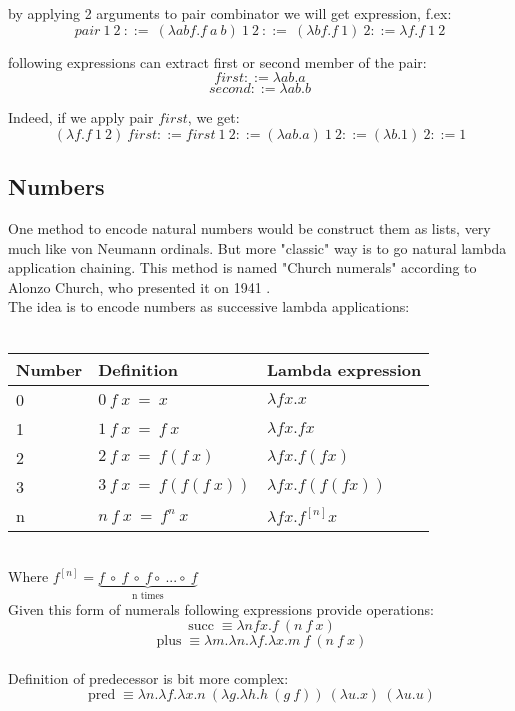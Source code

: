 by applying 2 arguments to pair combinator we will get expression, f.ex:
\[pair\ 1 \ 2\ ::=\ (\lambda{abf}.f\ a\ b)\ 1 \ 2\ ::=\ (\lambda{bf}.f\ 1)\ 2 ::= \lambda{f}.f\ 1\ 2 \]

following expressions can extract first or second member of the pair:
\[first ::= \lambda{ab}.a \] 
\[second ::= \lambda{ab}.b \] 

Indeed, if we apply pair $first$, we get:
\[(\lambda{f}.f\ 1\ 2)\ first ::= first\ 1\ 2 ::= (\lambda{ab}.a)\ 1\ 2 ::= (\lambda{b}.1)\ 2 ::= 1 \]



\subsection{Numbers}

One method to encode natural numbers would be construct them as lists, very much like von Neumann ordinals. But more "classic" way is to go natural lambda
application chaining. This method is named "Church numerals" according to Alonzo Church, who presented it on 1941 .
\\
The idea is to encode numbers as successive lambda applications:
\\
\\
\begin{tabular}{l l l}
    Number & Definition & Lambda expression \\
    \hline
    0 & $0\ f\ x\ =\ x$ & $\lambda{fx}.x$ \\
    1 & $1\ f\ x\ =\ f\ x$ & $\lambda{fx}.fx$ \\
    2 & $2\ f\ x\ =\ f(f\ x)$ & $\lambda{fx}.f(fx)$ \\
    3 & $3\ f\ x\ =\ f(f(f\ x))$ & $\lambda{fx}.f(f(fx))$ \\
    \hline
    \hline
    n & $n\ f\ x\ =\ f^n\ x$ & $\lambda{fx}.f^{[n]}x$
\end{tabular}
\\
Where $f^{[n]} = \underbrace{f\ \circ\ f\ \circ\ f \circ\ ...\circ\ f}_\text{n times}$ 
\\
Given this form of numerals following expressions provide operations:
\[\operatorname{succ} \equiv \lambda nfx. f\ (n\ f\ x)\]
\[\operatorname{plus} \equiv \lambda m.\lambda n.\lambda f.\lambda x. m\ f\ (n\ f\ x)\]
\\
Definition of predecessor is bit more complex:
\\
\[\operatorname{pred} \equiv \lambda n.\lambda f.\lambda x. n\ (\lambda g.\lambda h. h\ (g\ f))\ (\lambda u. x)\ (\lambda u. u)\]





